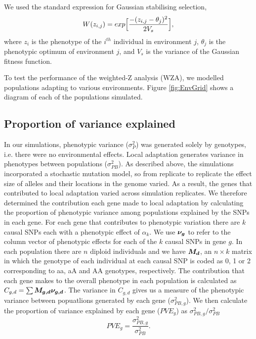\documentclass[11pt,twoside,lineno]{GSA_format}
\newcommand{\bm}[1]{\mbox{\boldmath{$#1$}}}
\begin{document}
We used the standard expression for Gaussian stabilising selection,
\begin{equation}
\notag
W(z_{i,j}) = exp \Big[\frac{-(z_{i,j} - \theta_j)^2}{2V_s}\Big],
\end{equation}
where $z_i$ is the phenotype of the $i^{th}$ individual in environment $j$, $\theta_j$ is the phenotypic optimum of environment $j$, and $V_s$ is the variance of the Gaussian fitness function. 

To test the performance of the weighted-Z analysis (WZA), we modelled populations adapting to various environments. Figure \ref{fig:EnvGrid} shows a diagram of each of the populations simulated.


\subsection{Proportion of variance explained} 

In our simulations, phenotypic variance ($\sigma^{2}_{P}$) was generated solely by genotypes, i.e. there were no environmental effects. Local adaptation generates variance in phenotypes between populations ($\sigma^{2}_{PB}$). 
As described above, the simulations incorporated a stochastic mutation model, so from replicate to replicate the effect size of alleles and their locations in the genome varied. As a result, the genes that contributed to local adaptation varied across simulation replicates. We therefore determined the contribution  each gene made to local adaptation by calculating the proportion of phenotypic variance among populations explained by the SNPs in each gene. For each gene that contributes to phenotypic variation there are $k$ causal SNPs each with a phenotypic effect of $\alpha_k$. We use $\bm{\nu_g}$ to refer to the column vector of phenotypic effects for each of the $k$ causal SNPs in gene $g$. In each population there are $n$ diploid individuals and we have $\bm{M_d}$, an $n \times k$ matrix in which the genotype of each individual at each causal SNP is coded as 0, 1 or 2 corresponding to aa, aA and AA genotypes, respectively. The contribution that each gene makes to the overall phenotype in each population is calculated as $C_{g,d} = \sum \bm{M_{g,d} \nu_{g,d}}$. The variance in $C_{g,d}$ gives us a measure of the phenotypic variance between popuatlions generated by each gene ($\sigma^{2}_{PB,g}$). We then calculate the proportion of variance explained by each gene ($PVE_g$) as $\sigma^{2}_{PB,g} / \sigma^{2}_{PB}$
\begin{equation}
PVE_g = \frac{\sigma^{2}_{PB,g}}{\sigma^{2}_{PB}}.
\end{equation}
\end{document}
